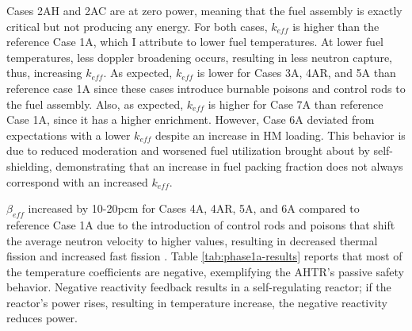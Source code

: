 Cases 2AH and 2AC are at zero power, meaning that the fuel assembly is exactly 
critical but not producing any energy. 
For both cases, $k_{eff}$ is higher than the reference Case 1A, which I attribute to 
lower fuel temperatures. 
At lower fuel temperatures, less doppler broadening occurs, 
resulting in less neutron capture, thus, increasing $k_{eff}$. 
As expected, $k_{eff}$ is lower for Cases 3A, 4AR, and 5A than reference case 
1A since these cases introduce burnable poisons and control rods to the fuel 
assembly. 
Also, as expected, $k_{eff}$ is higher for Case 7A than reference Case 1A, since 
it has a higher enrichment. 
However, Case 6A deviated from expectations with a lower $k_{eff}$ despite an increase 
in \acrlong{HM} loading. 
This behavior is due to reduced moderation and worsened fuel 
utilization brought about by self-shielding, demonstrating that an increase in 
fuel packing fraction does not always correspond with an increased $k_{eff}$. 

$\beta_{eff}$ increased by 10-20pcm for Cases 4A, 4AR, 5A, and 6A compared to
reference Case 1A due to the introduction of control rods and poisons that 
shift the average neutron velocity to higher values, resulting in decreased
thermal fission and increased fast fission \cite{torabi_neutronic_2018}.
Table \ref{tab:phase1a-results} reports that most of the temperature coefficients 
are negative, exemplifying the \gls{AHTR}'s passive safety behavior. 
Negative reactivity feedback results in a self-regulating reactor; if the reactor's 
power rises, resulting in temperature increase, the negative reactivity
reduces power. 

